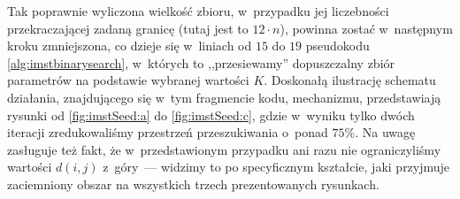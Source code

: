 Tak poprawnie wyliczona wielkość zbioru, w~przypadku jej liczebności przekraczającej zadaną granicę (tutaj jest to $12 \cdot n$), powinna zostać w~następnym kroku zmniejszona, co dzieje się w~liniach od $15$ do $19$ pseudokodu \ref{alg:imstbinarysearch}, w~których to ,,przesiewamy'' dopuszczalny zbiór parametrów na podstawie wybranej wartości $K$.
Doskonałą ilustrację schematu działania, znajdującego się w~tym fragmencie kodu, mechanizmu, przedstawiają rysunki od \ref{fig:imstSeed:a} do \ref{fig:imstSeed:c}, gdzie w~wyniku tylko dwóch iteracji zredukowaliśmy przestrzeń przeszukiwania o~ponad $75\%$.
Na uwagę zasługuje też fakt, że w~przedstawionym przypadku ani razu nie ograniczyliśmy wartości $d \left( i, j \right)$ z~góry~--- widzimy to po specyficznym kształcie, jaki przyjmuje zaciemniony obszar na wszystkich trzech prezentowanych rysunkach.

